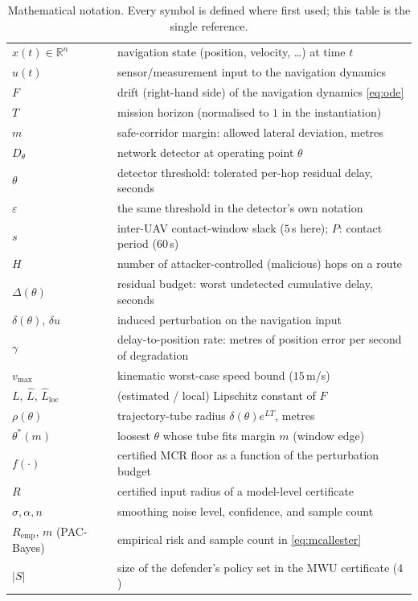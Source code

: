 \documentclass[conference]{IEEEtran}
\newcommand{\Real}{\mathbb{R}}
\begin{document}
\begin{table}[t]
\centering
\caption{Mathematical notation. Every symbol is defined where first used;
this table is the single reference.}
\label{tab:notation}
\small
\renewcommand{\arraystretch}{1.12}
\begin{tabularx}{\columnwidth}{@{}lX@{}}
\toprule
$x(t)\in\Real^n$ & navigation state (position, velocity, \dots) at time $t$\\
$u(t)$ & sensor/measurement input to the navigation dynamics\\
$F$ & drift (right-hand side) of the navigation dynamics \eqref{eq:ode}\\
$T$ & mission horizon (normalised to $1$ in the instantiation)\\
$m$ & safe-corridor margin: allowed lateral deviation, metres\\
$D_\theta$ & network detector at operating point $\theta$\\
$\theta$ & detector threshold: tolerated per-hop residual delay, seconds\\
$\varepsilon$ & the same threshold in the detector's own notation\\
$s$ & inter-UAV contact-window slack ($5$\,s here); $P$: contact period ($60$\,s)\\
$H$ & number of attacker-controlled (malicious) hops on a route\\
$\Delta(\theta)$ & residual budget: worst undetected cumulative delay, seconds\\
$\delta(\theta)$, $\delta u$ & induced perturbation on the navigation input\\
$\gamma$ & delay-to-position rate: metres of position error per second of degradation\\
$v_{\max}$ & kinematic worst-case speed bound ($15$\,m/s)\\
$L$, $\hat L$, $\hat L_{\mathrm{loc}}$ & (estimated / local) Lipschitz constant of $F$\\
$\rho(\theta)$ & trajectory-tube radius $\delta(\theta)e^{LT}$, metres\\
$\theta^{*}(m)$ & loosest $\theta$ whose tube fits margin $m$ (window edge)\\
$f(\cdot)$ & certified MCR floor as a function of the perturbation budget\\
$R$ & certified input radius of a model-level certificate\\
$\sigma,\alpha,n$ & smoothing noise level, confidence, and sample count\\
$R_{\mathrm{emp}}$, $m$ (PAC-Bayes) & empirical risk and sample count in \eqref{eq:mcallester}\\
$|S|$ & size of the defender's policy set in the MWU certificate ($4$)\\
\bottomrule
\end{tabularx}
\end{table}
\end{document}
